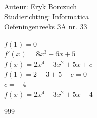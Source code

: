 \documentclass[a4paper]{article}
\begin{document}
  
\noindent \large Auteur: Eryk Borczuch \\
\noindent \large Studierichting: Informatica\\
\noindent \large Oefeningenreeks 3A nr. 33\\

\medskip

\normalsize

$f(1) = 0 $\\

$f'(x) = 8x^3-6x+5$\\

$f(x) = 2x^4 -3x^2 +5x +c$\\

$f(1) = 2-3+5+c = 0$\\

$c = -4$\\

$f(x) = 2x^4 -3x^2+5x-4$

\begin{thebibliography}{999}
\end{thebibliography}
\end{document}
